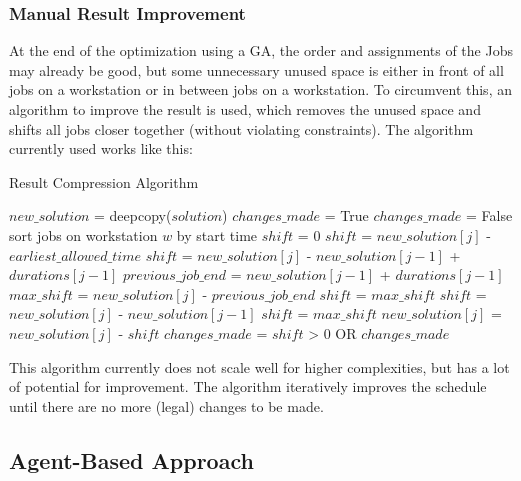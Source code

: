 \documentclass[a4paper,12pt,twoside]{scrreprt}
\begin{document}
\begin{flushleft}
\subsubsection{Manual Result Improvement}
At the end of the optimization using a GA, the order and assignments of the Jobs may already be good, but some unnecessary unused space is either in front of all jobs on a workstation or in between jobs on a workstation. To circumvent this, an algorithm to improve the result is used, which removes the unused space and shifts all jobs closer together (without violating constraints).
The algorithm currently used works like this:
\begin{algorithm}[H]
	\label{Result Compression Algorithm}
	\caption{Result Compression Algorithm}
	\begin{algorithmic}
		\STATE $new\_solution$ = deepcopy($solution$)
		\STATE $changes\_made$ = True
			\STATE $changes\_made$ = False
				\STATE sort jobs on workstation $w$ by start time
						\STATE $shift$ = 0
							\STATE $shift$ = $new\_solution[j]$ - $earliest\_allowed\_time$
						\ELSE
							\STATE $shift$ = $new\_solution[j]$ - $new\_solution[j-1]$ + $durations[j-1]$
						\ENDIF
					\ELSE
						\STATE $previous\_job\_end$ = $new\_solution[j-1]$ + $durations[j-1]$
						\STATE $max\_shift$ = $new\_solution[j]$ - $previous\_job\_end$
							\STATE $shift$ = $max\_shift$
						\ELSE
							\STATE $shift$ = $new\_solution[j]$ - $new\_solution[j-1]$
								\STATE $shift$ = $max\_shift$
							\ENDIF
						\ENDIF
					\ENDIF
					\STATE $new\_solution[j]$ = $new\_solution[j]$ - $shift$
					\STATE $changes\_made$ = $shift$ > 0 OR $changes\_made$
				\ENDFOR
			\ENDFOR
		\ENDWHILE
	\end{algorithmic}
\end{algorithm}
This algorithm currently does not scale well for higher complexities, but has a lot of potential for improvement.
The algorithm iteratively improves the schedule until there are no more (legal) changes to be made.

\subsection{Agent-Based Approach}


\end{flushleft}
\end{document}
